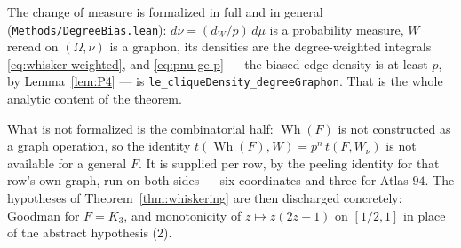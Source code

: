 \documentclass[11pt]{article}
\begin{document}
The change of measure is formalized in full and in general
(\texttt{Methods/DegreeBias.lean}): $d\nu=(d_W/p)\,d\mu$ is a probability
measure, $W$ reread on $(\Omega,\nu)$ is a graphon, its densities are the
degree-weighted integrals \eqref{eq:whisker-weighted}, and
\eqref{eq:pnu-ge-p} --- the biased edge density is at least $p$, by
Lemma~\ref{lem:P4} --- is \texttt{le\_cliqueDensity\_degreeGraphon}.  That is
the whole analytic content of the theorem.

What is not formalized is the combinatorial half: $\operatorname{Wh}(F)$ is not
constructed as a graph operation, so the identity
$t(\operatorname{Wh}(F),W)=p^{n}\,t(F,W_\nu)$ is not available for a general
$F$.  It is supplied per row, by the peeling identity for that row's own
graph, run on both sides --- six coordinates and three for Atlas $94$.  The
hypotheses of Theorem~\ref{thm:whiskering} are then discharged concretely:
Goodman for $F=K_3$, and monotonicity of $z\mapsto z(2z-1)$ on $[1/2,1]$ in
place of the abstract hypothesis (2).
\end{document}
